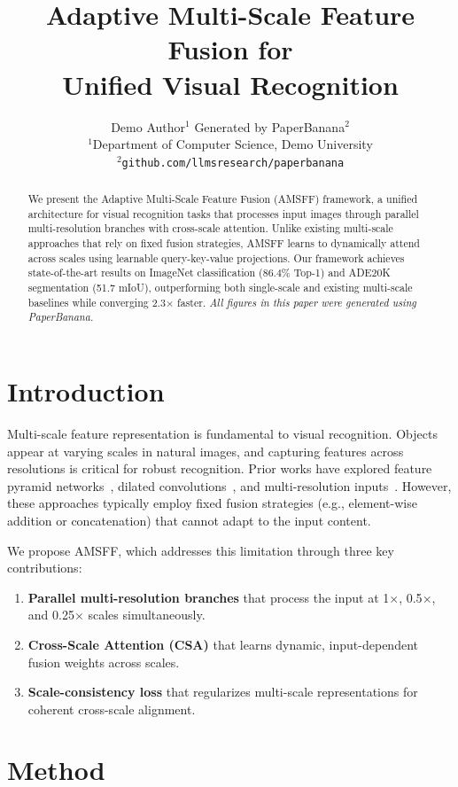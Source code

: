 \documentclass[10pt,twocolumn]{article}
\title{\textbf{Adaptive Multi-Scale Feature Fusion for\\Unified Visual Recognition}}
\author{
  Demo Author$^{1}$ \quad Generated by PaperBanana$^{2}$\\
  {\small $^{1}$Department of Computer Science, Demo University}\\
  {\small $^{2}$\texttt{github.com/llmsresearch/paperbanana}}
}
\date{}
\begin{document}
\maketitle

\begin{abstract}
We present the Adaptive Multi-Scale Feature Fusion (AMSFF) framework, a unified architecture for visual recognition tasks that processes input images through parallel multi-resolution branches with cross-scale attention. Unlike existing multi-scale approaches that rely on fixed fusion strategies, AMSFF learns to dynamically attend across scales using learnable query-key-value projections. Our framework achieves state-of-the-art results on ImageNet classification (86.4\% Top-1) and ADE20K segmentation (51.7 mIoU), outperforming both single-scale and existing multi-scale baselines while converging 2.3$\times$ faster.
\textit{All figures in this paper were generated using PaperBanana.}
\end{abstract}

\section{Introduction}

Multi-scale feature representation is fundamental to visual recognition. Objects appear at varying scales in natural images, and capturing features across resolutions is critical for robust recognition. Prior works have explored feature pyramid networks~\cite{lin2017feature}, dilated convolutions~\cite{yu2015multi}, and multi-resolution inputs~\cite{chen2018encoder}. However, these approaches typically employ fixed fusion strategies (e.g., element-wise addition or concatenation) that cannot adapt to the input content.

We propose AMSFF, which addresses this limitation through three key contributions:
\begin{enumerate}
    \item \textbf{Parallel multi-resolution branches} that process the input at 1$\times$, 0.5$\times$, and 0.25$\times$ scales simultaneously.
    \item \textbf{Cross-Scale Attention (CSA)} that learns dynamic, input-dependent fusion weights across scales.
    \item \textbf{Scale-consistency loss} that regularizes multi-scale representations for coherent cross-scale alignment.
\end{enumerate}

\section{Method}
\end{document}
